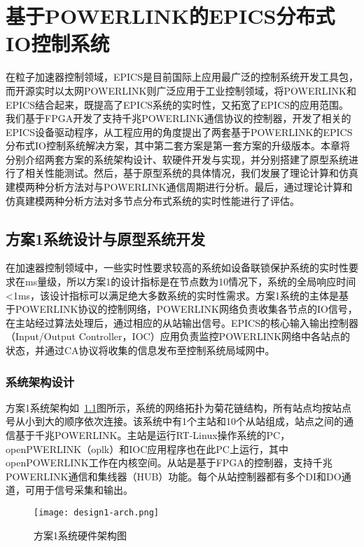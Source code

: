 
\chapter{基于POWERLINK的EPICS分布式IO控制系统}

在粒子加速器控制领域，EPICS是目前国际上应用最广泛的控制系统开发工具包，而开源实时以太网POWERLINK则广泛应用于工业控制领域，将POWERLINK和EPICS结合起来，既提高了EPICS系统的实时性，又拓宽了EPICS的应用范围。我们基于FPGA开发了支持千兆POWERLINK通信协议的控制器，开发了相关的EPICS设备驱动程序，从工程应用的角度提出了两套基于POWERLINK的EPICS分布式IO控制系统解决方案，其中第二套方案是第一套方案的升级版本。本章将分别介绍两套方案的系统架构设计、软硬件开发与实现，并分别搭建了原型系统进行了相关性能测试。然后，基于原型系统的具体情况，我们发展了理论计算和仿真建模两种分析方法对与POWERLINK通信周期进行分析。最后，通过理论计算和仿真建模两种分析方法对多节点分布式系统的实时性能进行了评估。

\section{方案1系统设计与原型系统开发}
\label{section:方案1系统设计与原型系统开发}
在加速器控制领域中，一些实时性要求较高的系统如设备联锁保护系统的实时性要求在ms量级，所以方案1的设计指标是在节点数为10情况下，系统的全局响应时间<1ms，该设计指标可以满足绝大多数系统的实时性需求。方案1系统的主体是基于POWERLINK协议的控制网络，POWERLINK网络负责收集各节点的IO信号，在主站经过算法处理后，通过相应的从站输出信号。EPICS的核心输入输出控制器（Input/Output Controller，IOC）应用负责监控POWERLINK网络中各站点的状态，并通过CA协议将收集的信息发布至控制系统局域网中。

\subsection{系统架构设计}
\label{subsection:方案1系统架构设计}
方案1系统架构如~\ref{fig:design1-arch}图所示，系统的网络拓扑为菊花链结构，所有站点均按站点号从小到大的顺序依次连接。该系统中有1个主站和10个从站组成，站点之间的通信基于千兆POWERLINK。主站是运行RT-Linux操作系统的PC，openPWERLINK（oplk）和IOC应用程序也在此PC上运行，其中openPOWERLINK工作在内核空间。从站是基于FPGA的控制器，支持千兆POWERLINK通信和集线器（HUB）功能。每个从站控制器都有多个DI和DO通道，可用于信号采集和输出。

\begin{figure}[!htb]
  \centering
  \texttt{[image: design1-arch.png]}
  \caption{方案1系统硬件架构图}
  \label{fig:design1-arch}
\end{figure}

